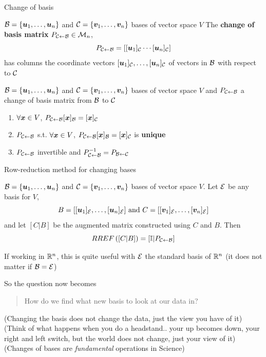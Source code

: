 \documentclass[aspectratio=169]{beamer}\usepackage[]{graphicx}\usepackage[]{xcolor}
\begin{document}
\begin{frame}{Change of basis}
\begin{definition}
$\mathcal{B}=\{\bm{u}_1,\ldots,\bm{u}_n\}$ and $\mathcal{C}=\{\bm{v}_1,\ldots,\bm{v}_n\}$ bases of vector space $V$
\vskip0.2cm
The \textbf{change of basis matrix} $P_{\mathcal{C}\leftarrow\mathcal{B}}\in\mathcal{M}_n$,
\[
P_{\mathcal{C}\leftarrow\mathcal{B}}
=\left[
[\bm{u}_1]_{\mathcal{C}} \cdots [\bm{u}_n]_{\mathcal{C}}
\right]
\]
has columns the coordinate vectors $[\bm{u}_1]_{\mathcal{C}},\ldots,[\bm{u}_n]_{\mathcal{C}}$ of vectors in $\mathcal{B}$ with respect to $\mathcal{C}$
\end{definition}
\vfill
\begin{theorem}
$\mathcal{B}=\{\bm{u}_1,\ldots,\bm{u}_n\}$ and $\mathcal{C}=\{\bm{v}_1,\ldots,\bm{v}_n\}$ bases of vector space $V$ and $P_{\mathcal{C}\leftarrow\mathcal{B}}$ a change of basis matrix from $\mathcal{B}$ to $\mathcal{C}$
\begin{enumerate}
\item $\forall\bm{x}\in V$, $P_{\mathcal{C}\leftarrow\mathcal{B}}[\bm{x}]_{\mathcal{B}} = [\bm{x}]_{\mathcal{C}}$
\item $P_{\mathcal{C}\leftarrow\mathcal{B}}$ s.t. $\forall\bm{x}\in V$, $P_{\mathcal{C}\leftarrow\mathcal{B}}[\bm{x}]_{\mathcal{B}} = [\bm{x}]_{\mathcal{C}}$ is \textbf{unique}
\item $P_{\mathcal{C}\leftarrow\mathcal{B}}$ invertible and $P_{\mathcal{C}\leftarrow\mathcal{B}}^{-1}=P_{\mathcal{B}\leftarrow\mathcal{C}}$
\end{enumerate}
\end{theorem}
\end{frame}


\begin{frame}{Row-reduction method for changing bases}
\begin{theorem}
$\mathcal{B}=\{\bm{u}_1,\ldots,\bm{u}_n\}$ and $\mathcal{C}=\{\bm{v}_1,\ldots,\bm{v}_n\}$ bases of vector space $V$. Let $\mathcal{E}$ be any basis for $V$,
\[
B = [[\bm{u}_1]_{\mathcal{E}},\ldots,[\bm{u}_n]_{\mathcal{E}}] 
\textrm{ and }
C = [[\bm{v}_1]_{\mathcal{E}},\ldots,[\bm{v}_n]_{\mathcal{E}}] 
\]
and let $[C|B]$ be the augmented matrix constructed using $C$ and $B$. Then
\[
RREF\left([C|B]\right)
=[\mathbb{I}|P_{\mathcal{C}\leftarrow\mathcal{B}}]
\]
\end{theorem}
\vfill
If working in $\mathbb{R}^n$, this is quite useful with $\mathcal{E}$ the standard basis of $\mathbb{R}^n$ (it does not matter if $\mathcal{B}=\mathcal{E}$)
\end{frame}

\begin{frame}
So the question now becomes
\begin{quote}
How do we find what new basis to look at our data in?
\end{quote}
\vfill
(Changing the basis does not change the data, just the view you have of it)
\vfill
(Think of what happens when you do a headstand.. your up becomes down, your right and left switch, but the world does not change, just your view of it)
\vfill
(Changes of bases are \emph{fundamental} operations in Science)
\end{frame}
\end{document}
